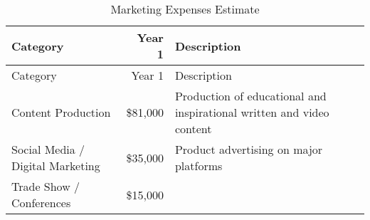 \documentclass[10pt,openany]{book}
\begin{document}
\begin{longtable}[]{@{}lrl@{}}
\caption{Marketing Expenses Estimate}\tabularnewline
\toprule
\begin{minipage}[b]{0.32\columnwidth}\raggedright
Category\strut
\end{minipage} & \begin{minipage}[b]{0.11\columnwidth}\raggedleft
Year 1\strut
\end{minipage} & \begin{minipage}[b]{0.48\columnwidth}\raggedright
Description\strut
\end{minipage}\tabularnewline
\midrule
\endfirsthead
\toprule
\begin{minipage}[b]{0.32\columnwidth}\raggedright
Category\strut
\end{minipage} & \begin{minipage}[b]{0.11\columnwidth}\raggedleft
Year 1\strut
\end{minipage} & \begin{minipage}[b]{0.48\columnwidth}\raggedright
Description\strut
\end{minipage}\tabularnewline
\midrule
\endhead
\begin{minipage}[t]{0.32\columnwidth}\raggedright
Content Production\strut
\end{minipage} & \begin{minipage}[t]{0.11\columnwidth}\raggedleft
\$81,000\strut
\end{minipage} & \begin{minipage}[t]{0.48\columnwidth}\raggedright
Production of educational and inspirational written and video
content\strut
\end{minipage}\tabularnewline
\begin{minipage}[t]{0.32\columnwidth}\raggedright
Social Media / Digital Marketing\strut
\end{minipage} & \begin{minipage}[t]{0.11\columnwidth}\raggedleft
\$35,000\strut
\end{minipage} & \begin{minipage}[t]{0.48\columnwidth}\raggedright
Product advertising on major platforms\strut
\end{minipage}\tabularnewline
\begin{minipage}[t]{0.32\columnwidth}\raggedright
Trade Show / Conferences\strut
\end{minipage} & \begin{minipage}[t]{0.11\columnwidth}\raggedleft
\$15,000\strut
\end{minipage} & \begin{minipage}[t]{0.48\columnwidth}\raggedright

\end{minipage}
\end{longtable}
\end{document}
